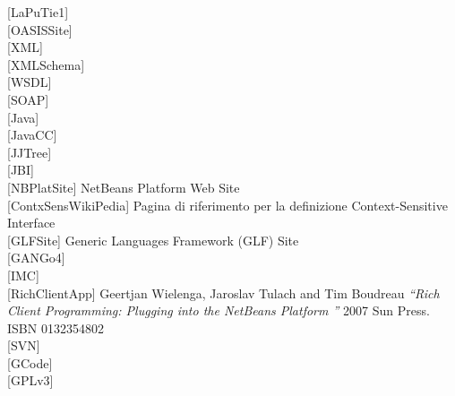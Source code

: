 \begin{thebibliography}{}

[LaPuTie1]
\\

[OASISSite]
\\

[XML]
\\

[XMLSchema]
\\

[WSDL]
\\

[SOAP]
\\

[Java]
\\

[JavaCC]
\\

[JJTree]
\\

[JBI]
\\

[NBPlatSite] NetBeans Platform Web Site
\\

[ContxSensWikiPedia] Pagina di riferimento per la definizione Context-Sensitive
Interface
\\

[GLFSite] Generic Languages Framework (GLF) Site	
\\

[GANGo4]
\\

[IMC]
\\


[RichClientApp] Geertjan Wielenga, Jaroslav Tulach and Tim Boudreau
\emph{``Rich Client Programming: Plugging into the NetBeans Platform ''} 2007
Sun Press. ISBN 0132354802
\\

[SVN]
\\

[GCode]
\\

[GPLv3]
\\

\end{thebibliography} 